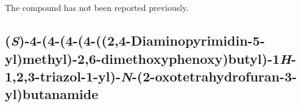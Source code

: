 \\[1\baselineskip]
\\[1\baselineskip]
The compound has not been reported previously.
	
	
\subsection{(\textit{S})-4-(4-(4-(4-((2,4-Diaminopyrimidin-5-yl)methyl)-2,6-dimethoxyphenoxy)\hfill\allowbreak butyl)-1\textit{H}-1,2,3-triazol-1-yl)-\textit{N}-(2-oxotetrahydrofuran-3-yl)butanamide }

	

